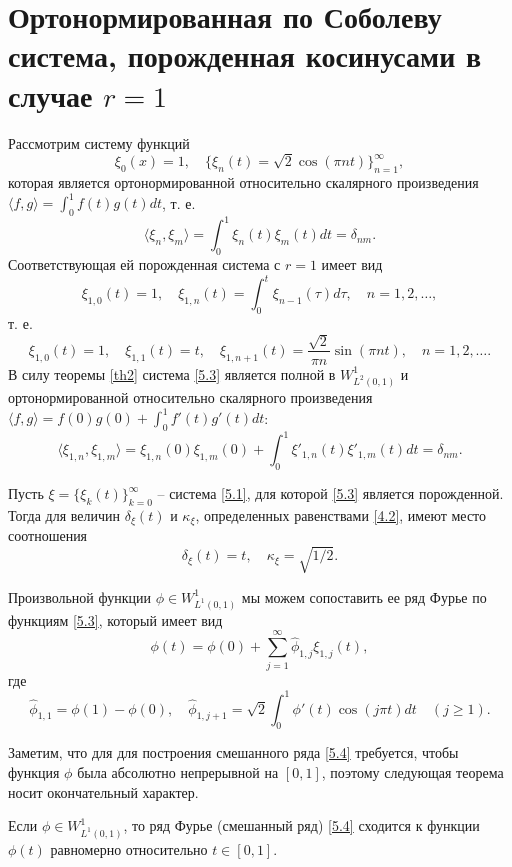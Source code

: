 \section{Ортонормированная по Соболеву  система, порожденная косинусами в случае $r=1$}
Рассмотрим систему функций
\begin{equation}\label{5.1}
\xi_0(x)=1,\quad \{\xi_n(t)=\sqrt{2}\cos(\pi nt)\}_{n=1}^\infty,
\end{equation}
которая является ортонормированной относительно скалярного произведения $\langle f,g \rangle=\int_0^1f(t)g(t)dt$, т. е.
\begin{equation}\label{5.2}
\langle\xi_n,\xi_m\rangle=\int_0^1\xi_n(t)\xi_m(t)dt=\delta_{nm}.
\end{equation}
Соответствующая ей порожденная система с $r=1$ имеет вид
$$
\xi_{1,0}(t)=1,\quad \xi_{1,n}(t)=\int_0^t \xi_{n-1}(\tau)d\tau, \quad n=1,2,\ldots,
$$
т. е.
\begin{equation}\label{5.3}
\xi_{1,0}(t)=1,\quad \xi_{1,1}(t)=t,\quad \xi_{1,n+1}(t)=\frac{\sqrt{2}}{\pi n}\sin(\pi nt),\quad n=1,2,\ldots.
\end{equation}
В силу теоремы \ref{th2} система \eqref{5.3} является полной в $W^1_{L^2(0,1)}$ и ортонормированной относительно скалярного произведения $\langle f,g\rangle=f(0)g(0)+\int_0^1 f'(t)g'(t)dt$:
\begin{equation*}
\langle\xi_{1,n},\xi_{1,m}\rangle=\xi_{1,n}(0)\xi_{1,m}(0)+\int_0^1\xi'_{1,n}(t)\xi'_{1,m}(t)dt=\delta_{nm}.
\end{equation*}

\begin{theorem}\label{th4}
	Пусть $\xi=\{\xi_k(t)\}_{k=0}^\infty$ -- система  \eqref{5.1}, для которой  \eqref{5.3} является порожденной. Тогда для величин $\delta_{\xi}(t)$ и    $\kappa_\xi$, определенных равенствами \eqref{4.2},  имеют место соотношения
	$$
	\delta_{\xi}(t)=t,\quad\kappa_{\xi}=\sqrt{1/2}.
	$$
\end{theorem}


Произвольной функции $\phi\in W^1_{L^1(0,1)}$ мы можем сопоставить ее ряд Фурье по функциям \eqref{5.3}, который имеет вид
\begin{equation}\label{5.4}
\phi(t)=\phi(0)+\sum_{j=1}^\infty \hat\phi_{1,j}\xi_{1,j}(t),
\end{equation}
где
$$
\hat\phi_{1,1}=\phi(1)-\phi(0),\quad
\hat\phi_{1,j+1}=\sqrt{2}\int_{0}^{1}\phi'(t)\cos(j\pi t)dt \quad(j\ge1).
$$


Заметим, что для  для построения смешанного ряда \eqref{5.4} требуется, чтобы функция $\phi$ была абсолютно непрерывной на $[0,1]$, поэтому следующая теорема носит окончательный характер.
\begin{theorem}\label{th5}
	Если $\phi\in W^1_{L^1(0,1)}$, то ряд Фурье (смешанный ряд) \eqref{5.4} сходится к функции $\phi(t)$ равномерно относительно $t\in[0,1]$.
\end{theorem}

